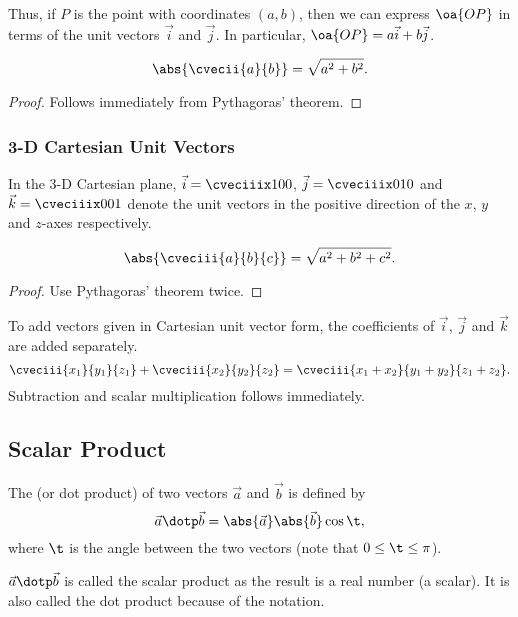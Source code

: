 Thus, if $P$ is the point with coordinates $(a, b)$, then we can express $\oa{OP}$ in terms of the unit vectors $\vec i$ and $\vec j$. In particular, $\oa{OP} = a\vec i + b \vec j$.

\begin{proposition}[Magnitude in 2-D]
    \[\abs{\cvecii{a}{b}} = \sqrt{a^2 + b^2}.\]
\end{proposition}
\begin{proof}
    Follows immediately from Pythagoras' theorem.
\end{proof}

\subsubsection{3-D Cartesian Unit Vectors}

\begin{definition}
    In the 3-D Cartesian plane, $\vec i = \cveciiix100$, $\vec j = \cveciiix010$ and $\vec k = \cveciiix001$ denote the unit vectors in the positive direction of the $x$, $y$ and $z$-axes respectively.
\end{definition}

\begin{proposition}[Magnitude in 3-D]
    \[\abs{\cveciii{a}{b}{c}} = \sqrt{a^2 + b^2 + c^2}.\]
\end{proposition}
\begin{proof}
    Use Pythagoras' theorem twice.
\end{proof}

\begin{fact}
    To add vectors given in Cartesian unit vector form, the coefficients of $\vec i$, $\vec j$ and $\vec k$ are added separately. \[\cveciii{x_1}{y_1}{z_1} + \cveciii{x_2}{y_2}{z_2} = \cveciii{x_1+x_2}{y_1+y_2}{z_1+z_2}.\] Subtraction and scalar multiplication follows immediately.
\end{fact}

\clearpage
\subsection{Scalar Product}

\begin{definition}
    The  (or dot product) of two vectors $\vec a$ and $\vec b$ is defined by \[\vec a \dotp \vec b = \abs{\vec a} \abs{\vec b} \cos \t,\] where $\t$ is the angle between the two vectors (note that $0 \leq \t \leq \pi$).
\end{definition}
\begin{remark}
    $\vec a \dotp \vec b$ is called the scalar product as the result is a real number (a scalar). It is also called the dot product because of the notation.
\end{remark}

